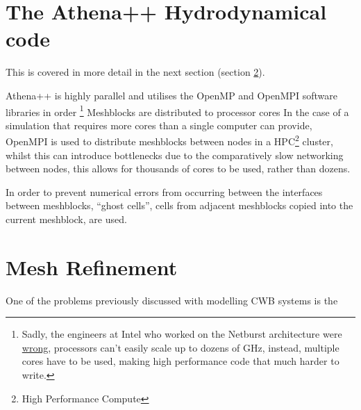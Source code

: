 

\section{The Athena++ Hydrodynamical code}
\label{sec:athenapp}




This is covered in more detail in the next section (section \ref{sec:refinement}).


Athena++ is highly parallel and utilises the OpenMP and OpenMPI software libraries in order \footnote{Sadly, the engineers at Intel who worked on the Netburst architecture were \href{https://web.archive.org/web/20210412001459/https://www.anandtech.com/show/680/6}{wrong}, processors can't easily scale up to dozens of \si{\giga\hertz}, instead, multiple cores have to be used, making high performance code that much harder to write.}
%
Meshblocks are distributed to processor cores 
In the case of a simulation that requires more cores than a single computer can provide, OpenMPI is used to distribute meshblocks between nodes in a HPC\footnote{High Performance Compute} cluster, whilst this can introduce bottlenecks due to the comparatively slow networking between nodes, this allows for thousands of cores to be used, rather than dozens.

In order to prevent numerical errors from occurring between the interfaces between meshblocks, ``ghost cells'', cells from adjacent meshblocks copied into the current meshblock, are used.



\section{Mesh Refinement}
\label{sec:refinement}

One of the problems previously discussed with modelling CWB systems is the 



